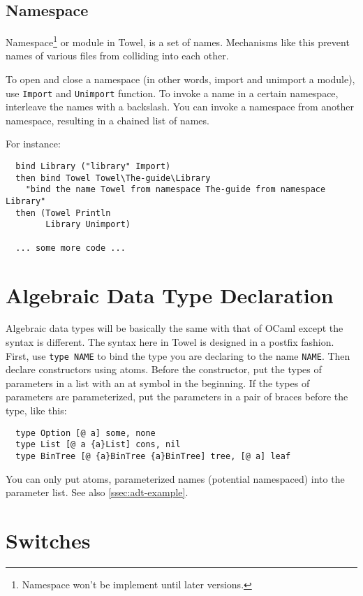\documentclass{book}
\begin{document}
\subsection{Namespace}

Namespace\footnote{Namespace won't be implement until later versions.} or module in Towel, is a set of names. Mechanisms like this prevent names of various files from colliding into each other.

To open and close a namespace (in other words, import and unimport a module), use \texttt{Import} and \texttt{Unimport} function. To invoke a name in a certain namespace, interleave the names with a backslash. You can invoke a namespace from another namespace, resulting in a chained list of names.

For instance:
\begin{verbatim}
  bind Library ("library" Import)
  then bind Towel Towel\The-guide\Library
    "bind the name Towel from namespace The-guide from namespace Library"
  then (Towel Println
        Library Unimport)

  ... some more code ...
\end{verbatim}


\section{Algebraic Data Type Declaration}
\label{ssec:atdf}

Algebraic data types will be basically the same with that of OCaml except the syntax is different. The syntax here in Towel is designed in a postfix fashion. First, use \texttt{type NAME} to bind the type you are declaring to the name \texttt{NAME}. Then declare constructors using atoms. Before the constructor, put the types of parameters in a list with an at symbol in the beginning. If the types of parameters are parameterized, put the parameters in a pair of braces before the type, like this:
\begin{verbatim}
  type Option [@ a] some, none
  type List [@ a {a}List] cons, nil
  type BinTree [@ {a}BinTree {a}BinTree] tree, [@ a] leaf
\end{verbatim}

You can only put atoms, parameterized names (potential namespaced) into the parameter list. See also \autoref{ssec:adt-example}.

\section{Switches}
\label{sec:switches}
\end{document}

